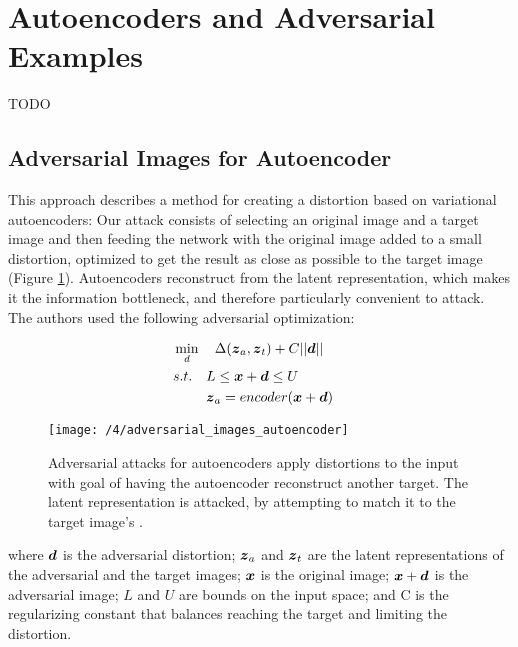 \section{Autoencoders and Adversarial Examples}\label{sec:combining}
TODO

\subsection{Adversarial Images for Autoencoder}
This approach \cite{tabacof2016adversarial} describes a method for creating a
distortion based on variational autoencoders: Our attack consists of selecting
an original image and a target image and then feeding the network with the
original image added to a small distortion, optimized to get the result as close
as possible to the target image (Figure
\ref{fig:adversarial_images_autoencoder}). Autoencoders reconstruct from the
latent representation, which makes it the information bottleneck, and therefore
particularly convenient to attack. The authors used the following adversarial
optimization:
    
\begin{align}
    & \min_{d} \quad \Delta(\boldsymbol{z}_{a}, \boldsymbol{z}_{t}) + C||\boldsymbol{d}|| && \\
    & s.t. \quad  
        \begin{aligned}[t]
            & L \leq \boldsymbol{x} + \boldsymbol{d} \leq U \\
            & \boldsymbol{z}_a = encoder(\boldsymbol{x} + \boldsymbol{d})
        \end{aligned}
\end{align}

\begin{figure}
	\centering
	\texttt{[image: /4/adversarial\_images\_autoencoder]}
    \caption{Adversarial attacks for autoencoders apply distortions to the input
    with goal of having the autoencoder reconstruct another target. The latent
    representation is attacked, by attempting to match it to the target image's
    \cite{tabacof2016adversarial}.} 
	\label{fig:adversarial_images_autoencoder}
\end{figure}

where $\boldsymbol{d}$ is the adversarial distortion; $\boldsymbol{z}_{a}$ and
$\boldsymbol{z}_{t}$ are the latent representations of the adversarial and the target
images; $\boldsymbol{x}$ is the original image; $\boldsymbol{x} + \boldsymbol{d}$ is the
adversarial image; $L$ and $U$ are bounds on the input space; and C is the
regularizing constant that balances reaching the target and limiting the
distortion.

